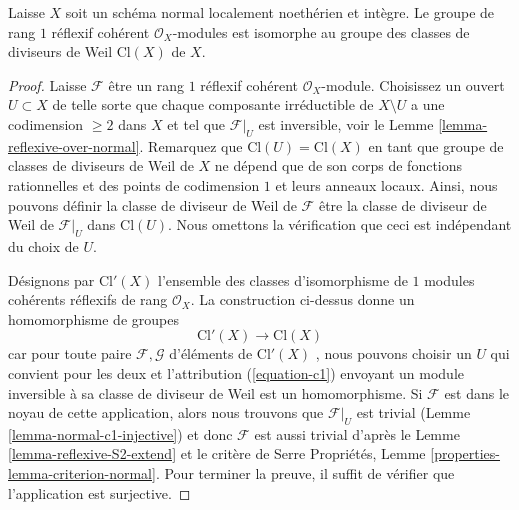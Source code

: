\begin{lemma}
\label{lemma-normal-class-group}
Laisse $X$ soit un schéma normal localement noethérien et intègre. Le
groupe de rang $1$ réflexif cohérent $\mathcal{O}_X$-modules est isomorphe au
groupe des classes de diviseurs de Weil $\text{Cl}(X)$  de  $X$.
\end{lemma}

\begin{proof}
Laisse $\mathcal{F}$ être un rang $1$ réflexif cohérent $\mathcal{O}_X$-module.
Choisissez un ouvert $U \subset X$  de telle sorte que chaque composante irréductible
de  $X \setminus U$ a une codimension $\geq 2$ dans $X$  et tel que
 $\mathcal{F}|_U$  est inversible, voir le Lemme  \ref{lemma-reflexive-over-normal}. Remarquez que
 $\text{Cl}(U) = \text{Cl}(X)$ en tant que groupe de classes de diviseurs de Weil de $X$ ne
dépend que de son corps de fonctions rationnelles et des points de
codimension $1$  et leurs anneaux locaux. Ainsi, nous pouvons définir la
classe de diviseur de Weil de  $\mathcal{F}$ être la classe de diviseur de Weil
de $\mathcal{F}|_U$ dans $\text{Cl}(U)$. Nous omettons la vérification que ceci est
indépendant du choix de  $U$.

\medskip\noindent
Désignons par  $\text{Cl}'(X)$  l'ensemble des classes d'isomorphisme de  $1$ 
modules cohérents réflexifs de rang  $\mathcal{O}_X$. La construction ci-dessus donne
un homomorphisme de groupes
$$
\text{Cl}'(X) \longrightarrow \text{Cl}(X)
$$
car pour toute paire  $\mathcal{F}, \mathcal{G}$  d'éléments de  $\text{Cl}'(X)$ , nous pouvons choisir
un  $U$  qui convient pour les deux et l'attribution (\ref{equation-c1})
envoyant un module inversible à sa classe de diviseur de Weil est un
homomorphisme. Si  $\mathcal{F}$  est dans le noyau de cette application, alors nous
trouvons que  $\mathcal{F}|_U$  est trivial (Lemme  \ref{lemma-normal-c1-injective}) et donc  $\mathcal{F}$ 
est aussi trivial d'après le Lemme  \ref{lemma-reflexive-S2-extend}  et le critère de Serre Propriétés,
Lemme  \ref{properties-lemma-criterion-normal}. Pour terminer la preuve, il suffit de vérifier que
l'application est surjective.


\end{proof}
